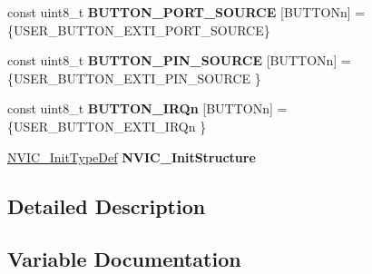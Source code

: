 \begin{DoxyCompactItemize}
\item 
\hypertarget{group___s_t_m32_f4___d_i_s_c_o_v_e_r_y___l_o_w___l_e_v_e_l___private___variables_ga043001d613d9070343f086a1fb778b56}{}const uint8\+\_\+t {\bfseries B\+U\+T\+T\+O\+N\+\_\+\+P\+O\+R\+T\+\_\+\+S\+O\+U\+R\+C\+E} \mbox{[}B\+U\+T\+T\+O\+Nn\mbox{]} = \{U\+S\+E\+R\+\_\+\+B\+U\+T\+T\+O\+N\+\_\+\+E\+X\+T\+I\+\_\+\+P\+O\+R\+T\+\_\+\+S\+O\+U\+R\+C\+E\}\label{group___s_t_m32_f4___d_i_s_c_o_v_e_r_y___l_o_w___l_e_v_e_l___private___variables_ga043001d613d9070343f086a1fb778b56}

\item 
\hypertarget{group___s_t_m32_f4___d_i_s_c_o_v_e_r_y___l_o_w___l_e_v_e_l___private___variables_ga80c29ecf61c61be41ec382cd2a93fcec}{}const uint8\+\_\+t {\bfseries B\+U\+T\+T\+O\+N\+\_\+\+P\+I\+N\+\_\+\+S\+O\+U\+R\+C\+E} \mbox{[}B\+U\+T\+T\+O\+Nn\mbox{]} = \{U\+S\+E\+R\+\_\+\+B\+U\+T\+T\+O\+N\+\_\+\+E\+X\+T\+I\+\_\+\+P\+I\+N\+\_\+\+S\+O\+U\+R\+C\+E \}\label{group___s_t_m32_f4___d_i_s_c_o_v_e_r_y___l_o_w___l_e_v_e_l___private___variables_ga80c29ecf61c61be41ec382cd2a93fcec}

\item 
\hypertarget{group___s_t_m32_f4___d_i_s_c_o_v_e_r_y___l_o_w___l_e_v_e_l___private___variables_ga13c3e27c584df9fccc4697dd535ea1cd}{}const uint8\+\_\+t {\bfseries B\+U\+T\+T\+O\+N\+\_\+\+I\+R\+Qn} \mbox{[}B\+U\+T\+T\+O\+Nn\mbox{]} = \{U\+S\+E\+R\+\_\+\+B\+U\+T\+T\+O\+N\+\_\+\+E\+X\+T\+I\+\_\+\+I\+R\+Qn \}\label{group___s_t_m32_f4___d_i_s_c_o_v_e_r_y___l_o_w___l_e_v_e_l___private___variables_ga13c3e27c584df9fccc4697dd535ea1cd}

\item 
\hypertarget{group___s_t_m32_f4___d_i_s_c_o_v_e_r_y___l_o_w___l_e_v_e_l___private___variables_ga97a738439b47cc7e96fb8c57ea0f94df}{}\hyperlink{struct_n_v_i_c___init_type_def}{N\+V\+I\+C\+\_\+\+Init\+Type\+Def} {\bfseries N\+V\+I\+C\+\_\+\+Init\+Structure}\label{group___s_t_m32_f4___d_i_s_c_o_v_e_r_y___l_o_w___l_e_v_e_l___private___variables_ga97a738439b47cc7e96fb8c57ea0f94df}

\end{DoxyCompactItemize}


\subsection{Detailed Description}


\subsection{Variable Documentation}
\hypertarget{group___s_t_m32_f4___d_i_s_c_o_v_e_r_y___l_o_w___l_e_v_e_l___private___variables_gaeef08b09ae717d36fdb4693a58ae0261}{}
